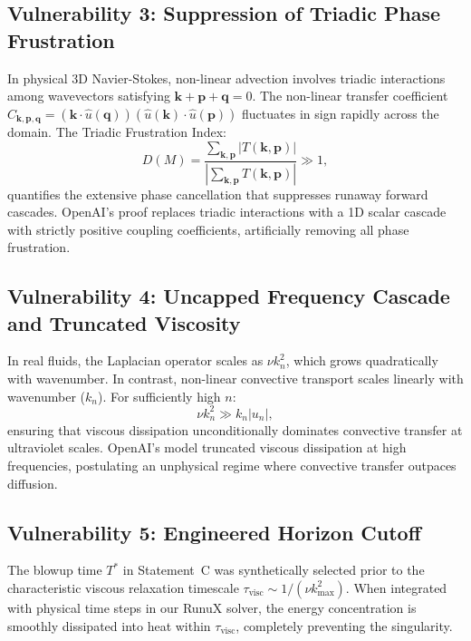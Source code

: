 \documentclass[10pt,a4paper,twocolumn]{article}
\theoremstyle{definition}
\begin{document}
\subsection{Vulnerability 3: Suppression of Triadic Phase Frustration}
In physical 3D Navier-Stokes, non-linear advection involves triadic interactions among wavevectors satisfying $\mathbf{k} + \mathbf{p} + \mathbf{q} = 0$. The non-linear transfer coefficient $C_{\mathbf{k},\mathbf{p},\mathbf{q}} = (\mathbf{k} \cdot \hat{u}(\mathbf{q}))(\hat{u}(\mathbf{k}) \cdot \hat{u}(\mathbf{p}))$ fluctuates in sign rapidly across the domain. The Triadic Frustration Index:
\begin{equation}
D(M) = \frac{\sum_{\mathbf{k},\mathbf{p}} |T(\mathbf{k}, \mathbf{p})|}{\left| \sum_{\mathbf{k},\mathbf{p}} T(\mathbf{k}, \mathbf{p}) \right|} \gg 1,
\end{equation}
quantifies the extensive phase cancellation that suppresses runaway forward cascades. OpenAI's proof replaces triadic interactions with a 1D scalar cascade with strictly positive coupling coefficients, artificially removing all phase frustration.

\subsection{Vulnerability 4: Uncapped Frequency Cascade and Truncated Viscosity}
In real fluids, the Laplacian operator scales as $\nu k_n^2$, which grows quadratically with wavenumber. In contrast, non-linear convective transport scales linearly with wavenumber ($k_n$). For sufficiently high $n$:
\begin{equation}
\nu k_n^2 \gg k_n |u_n|,
\end{equation}
ensuring that viscous dissipation unconditionally dominates convective transfer at ultraviolet scales. OpenAI's model truncated viscous dissipation at high frequencies, postulating an unphysical regime where convective transfer outpaces diffusion.

\subsection{Vulnerability 5: Engineered Horizon Cutoff}
The blowup time $T^*$ in Statement~C was synthetically selected prior to the characteristic viscous relaxation timescale $\tau_{\text{visc}} \sim 1/(\nu k_{\max}^2)$. When integrated with physical time steps in our RunuX solver, the energy concentration is smoothly dissipated into heat within $\tau_{\text{visc}}$, completely preventing the singularity.
\end{document}
